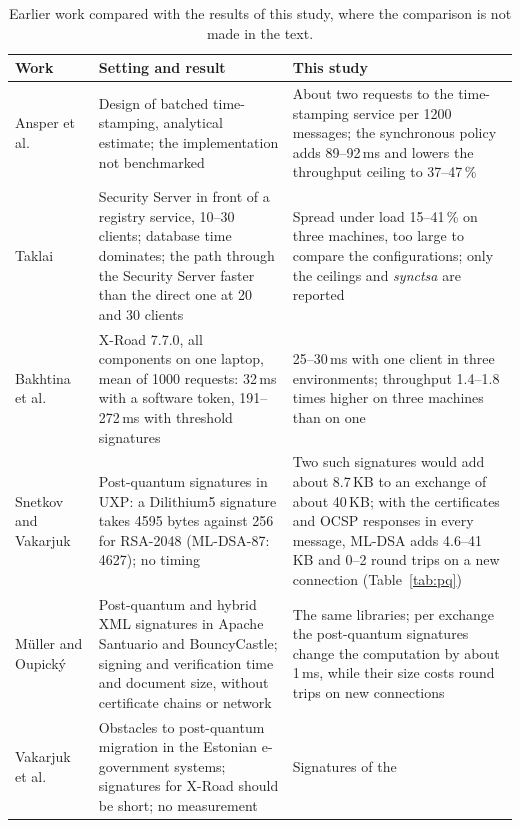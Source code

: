 \documentclass[conference,a4paper]{IEEEtran}
\newcommand{\newtext}[1]{{\color{blue}#1}}
\begin{document}
\begin{table}[!b]
\centering\small
\caption{\newtext{Earlier work compared with the results of this study, where the comparison is not
made in the text.}}
\label{tab:related}
\color{blue}
\begin{tabular}{@{}p{}p{}p{}@{}}
\toprule
Work & Setting and result & This study \\
\midrule
Ansper et al.~\cite{ansper2013} & Design of batched time-stamping, analytical estimate; the
implementation not benchmarked & About two requests to the time-stamping service per 1200 messages;
the synchronous policy adds 89--92\,ms and lowers the throughput ceiling to 37--47\,\% \\
\addlinespace
Taklai~\cite{taklai2020} & Security Server in front of a registry service, 10--30 clients; database
time dominates; the path through the Security Server faster than the direct one at 20 and 30
clients & Spread under load 15--41\,\% on three machines, too large to compare the configurations;
only the ceilings and \emph{synctsa} are reported \\
\addlinespace
Bakhtina et al.~\cite{bakhtina2026ijis} & X-Road 7.7.0, all components on one laptop, mean of 1000
requests: 32\,ms with a software token, 191--272\,ms with threshold signatures & 25--30\,ms with one
client in three environments; \newtext{throughput 1.4--1.8 times higher on three machines than on one} \\
\addlinespace
Snetkov and Vakarjuk~\cite{snetkov2023} & Post-quantum signatures in UXP: a Dilithium5 signature
takes 4595 bytes against 256 for RSA-2048 (ML-DSA-87: 4627); no timing & \newtext{Two such signatures would
add about 8.7\,KB to an exchange of about 40\,KB; with the certificates and OCSP responses in every
message, ML-DSA adds 4.6--41\,KB and 0--2 round trips on a new connection (Table~\ref{tab:pq})} \\
\addlinespace
Müller and Oupický~\cite{mueller2024} & Post-quantum and hybrid XML signatures in Apache Santuario
and BouncyCastle; signing and verification time and document size, without certificate chains or
network & The same libraries; per exchange the post-quantum signatures change the computation by
about 1\,ms, while their size costs round trips on new connections \\
\addlinespace
Vakarjuk et al.~\cite{vakarjuk2024} & Obstacles to post-quantum migration in the Estonian
e-government systems; signatures for X-Road should be short; no measurement & Signatures of the

\end{tabular}
\end{table}
\end{document}
